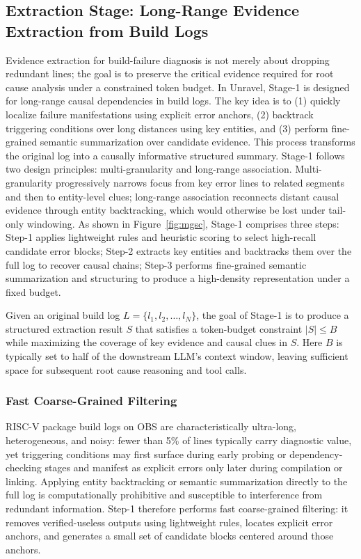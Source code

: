 \documentclass[sigconf,anonymous]{acmart}
\begin{document}
\subsection{Extraction Stage: Long-Range Evidence Extraction from Build Logs}\label{sec:ceel}

Evidence extraction for build-failure diagnosis is not merely about dropping redundant lines; the goal is to preserve the critical evidence required for root cause analysis under a constrained token budget. In Unravel, Stage-1 is designed for long-range causal dependencies in build logs. The key idea is to (1) quickly localize failure manifestations using explicit error anchors, (2) backtrack triggering conditions over long distances using key entities, and (3) perform fine-grained semantic summarization over candidate evidence. This process transforms the original log into a causally informative structured summary. Stage-1 follows two design principles: multi-granularity and long-range association. Multi-granularity progressively narrows focus from key error lines to related segments and then to entity-level clues; long-range association reconnects distant causal evidence through entity backtracking, which would otherwise be lost under tail-only windowing. As shown in Figure~\ref{fig:mgsc}, Stage-1 comprises three steps: Step-1 applies lightweight rules and heuristic scoring to select high-recall candidate error blocks; Step-2 extracts key entities and backtracks them over the full log to recover causal chains; Step-3 performs fine-grained semantic summarization and structuring to produce a high-density representation under a fixed budget.

Given an original build log $L = \{l_1, l_2, \ldots, l_N\}$, the goal of Stage-1 is to produce a structured extraction result $S$ that satisfies a token-budget constraint $|S| \leq B$ while maximizing the coverage of key evidence and causal clues in $S$. Here $B$ is typically set to half of the downstream LLM's context window, leaving sufficient space for subsequent root cause reasoning and tool calls.

\subsubsection{Fast Coarse-Grained Filtering}

RISC-V package build logs on OBS are characteristically ultra-long, heterogeneous, and noisy: fewer than 5\% of lines typically carry diagnostic value, yet triggering conditions may first surface during early probing or dependency-checking stages and manifest as explicit errors only later during compilation or linking. Applying entity backtracking or semantic summarization directly to the full log is computationally prohibitive and susceptible to interference from redundant information. Step-1 therefore performs fast coarse-grained filtering: it removes verified-useless outputs using lightweight rules, locates explicit error anchors, and generates a small set of candidate blocks centered around those anchors.
\end{document}
